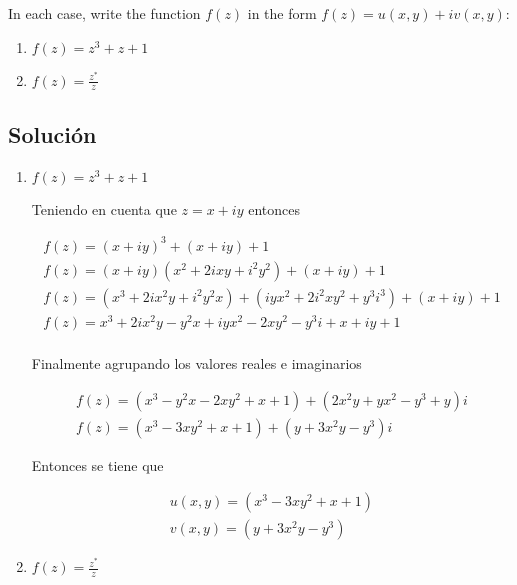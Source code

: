 \begin{problem}{2}
    In each case, write the function $f(z)$ in the form $f(z) = u(x, y)+iv(x, y)$:
    \begin{enumerate}
        \item $f(z) = z^3 + z + 1$
        \item $f(z) = \frac{z^{*}}{z}$
    \end{enumerate}
\end{problem}

\subsection*{Solución}

\begin{enumerate}
    \item $f(z) = z^3 + z + 1$
    
    Teniendo en cuenta que $z = x + iy$ entonces 

    \begin{gather*}
        f(z) = (x + iy)^3 + (x + iy) + 1\\
        f(z) = (x + iy)(x^2 + 2ixy + i^2y^2) + (x + iy) + 1\\
        f(z) = (x^3 + 2ix^2y + i^2y^2x) + (iyx^2 + 2i^2xy^2 + y^3i^3) + (x + iy) + 1\\
        f(z) = x^3 + 2ix^2y - y^2x + iyx^2 - 2xy^2 - y^3i + x + iy + 1\\
    \end{gather*}

    Finalmente agrupando los valores reales e imaginarios 

    \begin{gather*}
        f(z) = (x^3 - y^2x - 2xy^2 + x +1) + (2x^2y + yx^2 - y^3  + y)i\\
        f(z) = (x^3 - 3xy^2 + x +1) + (y + 3x^2y - y^3)i
    \end{gather*}

    Entonces se tiene que 

    \begin{mdframed}
        \vspace{-0.25cm}
        \begin{gather}
            u(x,y) = (x^3 - 3xy^2 + x +1)\\
            v(x,y) = (y + 3x^2y - y^3)
        \end{gather}
        \vspace{-0.3cm}
    \end{mdframed}
    \newpage
    \item $f(z) = \frac{z^{*}}{z}$
    

\end{enumerate}

